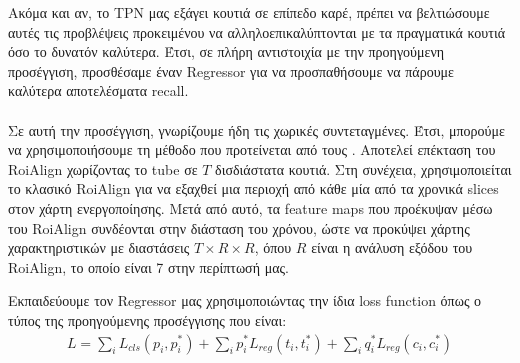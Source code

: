 Ακόμα και αν, το  \en TPN \gr μας εξάγει κουτιά σε επίπεδο καρέ, πρέπει να βελτιώσουμε αυτές τις προβλέψεις προκειμένου να αλληλοεπικαλύπτονται
με τα πραγματικά κουτιά  όσο το δυνατόν καλύτερα.
Έτσι, σε πλήρη αντιστοιχία με την προηγούμενη προσέγγιση, προσθέσαμε έναν \en Regressor \gr για να προσπαθήσουμε να πάρουμε καλύτερα αποτελέσματα \en recall\gr.

\paragraph{}
Σε αυτή την προσέγγιση, γνωρίζουμε ήδη τις χωρικές συντεταγμένες. Έτσι, μπορούμε να χρησιμοποιήσουμε τη μέθοδο που προτείνεται από τους \en\cite{DBLP:journals/corr/abs-1712-09184}\gr. Αποτελεί
επέκταση του \en RoiAlign \gr χωρίζοντας το \en tube \gr σε $T$ δισδιάστατα κουτιά. Στη συνέχεια, χρησιμοποιείται το  κλασικό \en RoiAlign \gr για να εξαχθεί  μια περιοχή από κάθε μία από τα 
χρονικά \en slices \gr στον χάρτη ενεργοποίησης. Μετά από αυτό, τα \en feature maps \gr που προέκυψαν μέσω του \en RoiAlign \gr συνδέονται στην διάσταση του χρόνου, ώστε να προκύψει
χάρτης χαρακτηριστικών με διαστάσεις $T \times R \times R$,  όπου $R $ είναι η ανάλυση εξόδου του \en RoiAlign\gr, το οποίο είναι 7 στην περίπτωσή μας.  \par


Εκπαιδεύουμε τον \en Regressor \gr μας χρησιμοποιώντας την ίδια \en loss function \gr όπως ο τύπος της προηγούμενης προσέγγισης που είναι:
\begin{equation*} 
\begin{split}
 L  =  \sum_iL_{cls}(p_i, p_i^*) +
 \sum_ip_i^*L_{reg}(t_i,t_i^*) +  
  \sum_iq_i^*L_{reg}(c_{i}, c_{i}^*)  \\
\end{split}
\end{equation*}

